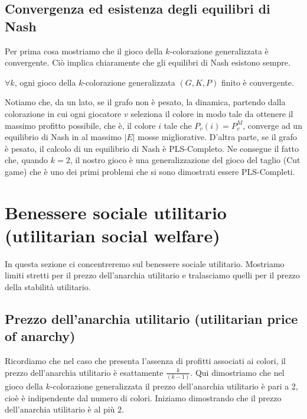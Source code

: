 \subsection{Convergenza ed esistenza degli equilibri di Nash}
\justify
Per prima cosa mostriamo che il gioco della \(k\)-colorazione generalizzata è convergente. Ciò implica chiaramente che gli equilibri di Nash esistono sempre.\\

\begin{prop}
\label{proposition1}
	\(\forall k\), ogni gioco della \(k\)-colorazione generalizzata \((G, K, P)\) finito è convergente.
\end{prop}

Notiamo che, da un lato, se il grafo non è pesato, la dinamica, partendo dalla colorazione in cui ogni giocatore \(v\) seleziona il colore in modo tale da ottenere il massimo profitto possibile, che è, il colore \(i\) tale che \(P_v (i) = P_v^M\), converge ad un equilibrio di Nash in al massimo \(|E|\) mosse migliorative. D'altra parte, se il grafo è pesato, il calcolo di un equilibrio di Nash è PLS-Completo. Ne consegue il fatto che, quando \(k = 2\), il nostro gioco è una generalizzazione del gioco del taglio (Cut game) che è uno dei primi problemi che si sono dimostrati essere PLS-Completi.\\

\section{Benessere sociale utilitario (utilitarian social welfare)}
\justify
In questa sezione ci concentreremo sul benessere sociale utilitario. Mostriamo limiti stretti per il prezzo dell'anarchia utilitario e tralasciamo quelli per il prezzo della stabilità utilitario.\\

\subsection{Prezzo dell'anarchia utilitario (utilitarian price of anarchy)}
\justify
Ricordiamo che nel caso che presenta l'assenza di profitti associati ai colori, il prezzo dell'anarchia utilitario è esattamente \(\frac{k}{(k-1)}\). Qui dimostriamo che nel gioco della \(k\)-colorazione generalizzata il prezzo dell'anarchia utilitario è pari a 2, cioè è indipendente dal numero di colori. Iniziamo dimostrando che il prezzo dell'anarchia utilitario è al più 2.\\

